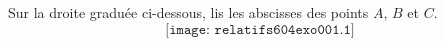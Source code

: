 Sur la droite graduée ci-dessous, lis les abscisses des points $A$, $B$ et $C$.
\[\texttt{[image: relatifs604exo001.1]}\]
